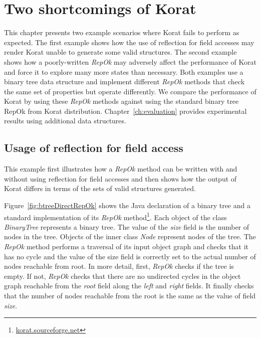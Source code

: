 \chapter{Two shortcomings of Korat}
\label{ch:shortcomings-of-korat}
This chapter presents two example scenarios where
Korat fails to perform as expected.  The first
example shows how the use of reflection for field accesses may render
Korat unable to generate some valid structures.  The second example
shows how a poorly-written \emph{RepOk} may adversely affect the performance
of Korat and force it to explore many more states than necessary.
Both examples use a binary tree data structure and implement different
\emph{RepOk} methods that check the same set of properties but operate
differently.  We compare the performance of Korat by using these \emph{RepOk}
methods against using the standard binary tree RepOk from Korat
distribution.  Chapter~\ref{ch:evaluation} provides experimental
results using additional data structures.

\section{Usage of reflection for field access}
\label{sec:usage-of-reflection-for-field-access}
This example first illustrates how a \emph{RepOk} method can be written with
and without using reflection for field accesses and then shows how the
output of Korat differs in terms of the sets of valid structures
generated.

\para
Figure~\ref{fig:btreeDirectRepOk} shows the Java declaration of a
binary tree and a standard implementation of its \emph{RepOk}
method\footnote{\url{korat.sourceforge.net}}. Each object of the class
\emph{BinaryTree} represents a binary tree. The value of the
\emph{size} field is the number of nodes in the tree. Objects of the
inner class \emph{Node} represent nodes of the tree.  The \emph{RepOk} method
performs a traversal of its input object graph and checks that it has
no cycle and the value of the size field is correctly set to the
actual number of nodes reachable from root.  In more detail, first,
\emph{RepOk} checks if the tree is empty. If not, \emph{RepOk} checks
that there are no undirected cycles in the object graph reachable from
the \emph{root} field along the \emph{left} and \emph{right}
fields. It finally checks that the number of nodes reachable from the
root is the same as the value of field \emph{size}.

